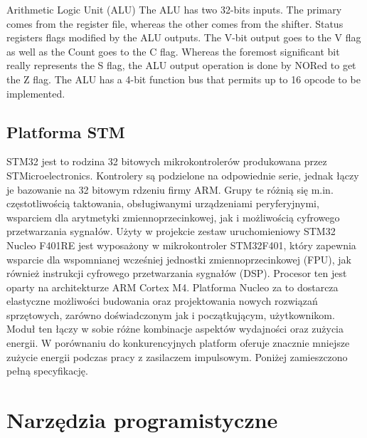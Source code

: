 Arithmetic Logic Unit (ALU)
The ALU has two 32-bits inputs. The primary comes from the register file, whereas the other
 comes from the shifter. Status registers flags modified by the ALU outputs. The V-bit output
  goes to the V flag as well as the Count goes to the C flag. Whereas the foremost significant
   bit really  represents  the S  flag,  the  ALU  output  operation is  done by NORed to  get 
    the  Z  flag. The ALU has a 4-bit function bus that permits up to 16 opcode to be implemented.


\subsection{Platforma STM} \label{sec:stm}
STM32 jest to rodzina 32 bitowych mikrokontrolerów produkowana przez STMicroelectronics.
Kontrolery są podzielone na odpowiednie serie, jednak łączy je bazowanie na 32 bitowym
rdzeniu firmy ARM. Grupy te różnią się m.in. częstotliwością taktowania, obsługiwanymi
urządzeniami peryferyjnymi, wsparciem dla arytmetyki zmiennoprzecinkowej, jak i możliwością
cyfrowego przetwarzania sygnałów.
Użyty w projekcie zestaw uruchomieniowy STM32 Nucleo F401RE jest wyposażony w mikrokontroler
STM32F401, który zapewnia wsparcie dla wspomnianej wcześniej jednostki zmiennoprzecinkowej (FPU),
jak również instrukcji cyfrowego przetwarzania sygnałów (DSP). Procesor ten jest oparty na
architekturze ARM Cortex M4. Platforma Nucleo za to dostarcza elastyczne
możliwości budowania oraz projektowania nowych rozwiązań sprzętowych, zarówno
doświadczonym jak i początkującym, użytkownikom. Moduł ten łączy w sobie różne kombinacje
aspektów wydajności oraz zużycia energii. W porównaniu do konkurencyjnych platform oferuje
znacznie mniejsze zużycie energii podczas pracy z zasilaczem impulsowym.
Poniżej zamieszczono pełną specyfikację.

\section{Narzędzia programistyczne} \label{sec:prog}

